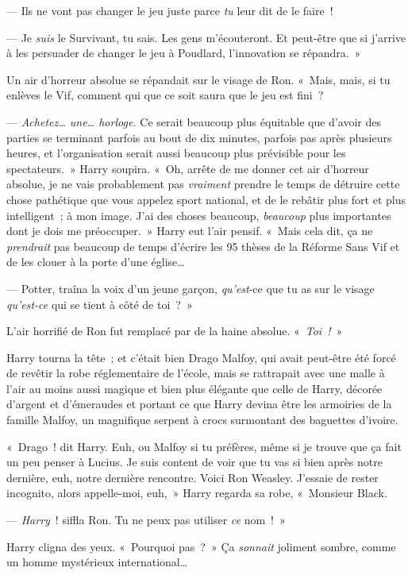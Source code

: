 --- Ils ne vont pas changer le jeu juste parce \emph{tu} leur dit de le faire~!

--- Je \emph{suis} le Survivant, tu sais. Les gens m'écouteront. Et peut-être que si j'arrive à les persuader de changer le jeu à Poudlard, l'innovation se répandra.~»

Un air d'horreur absolue se répandait sur le visage de Ron.
«~Mais, mais, si tu enlèves le Vif, comment qui que ce soit saura que le jeu est fini~?

--- \emph{Achetez… une… horloge.} Ce serait beaucoup plus équitable que d'avoir des parties se terminant parfois au bout de dix minutes, parfois pas après plusieurs heures, et l'organisation serait aussi beaucoup plus prévisible pour les spectateurs.~» Harry soupira. «~Oh, arrête de me donner cet air d'horreur absolue, je ne vais probablement pas \emph{vraiment} prendre le temps de détruire cette chose pathétique que vous appelez sport national, et de le rebâtir plus fort et plus intelligent~; à mon image. J'ai des choses beaucoup, \emph{beaucoup} plus importantes dont je dois me préoccuper.~» Harry eut l'air pensif. «~Mais cela dit, ça ne \emph{prendrait} pas beaucoup de temps d'écrire les 95 thèses de la Réforme Sans Vif et de les clouer à la porte d'une église…

--- Potter, traîna la voix d'un jeune garçon, \emph{qu'est}-ce que tu as sur le visage \emph{qu'est-ce} qui se tient à côté de toi~?~»

L'air horrifié de Ron fut remplacé par de la haine absolue. «~\emph{Toi~!}~»

Harry tourna la tête~; et c'était bien Drago Malfoy, qui avait peut-être été forcé de revêtir la robe réglementaire de l'école, mais se rattrapait avec une malle à l'air au moins aussi magique et bien plus élégante que celle de Harry, décorée d'argent et d'émeraudes et portant ce que Harry devina être les armoiries de la famille Malfoy, un magnifique serpent à crocs surmontant des baguettes d'ivoire.

«~Drago~! dit Harry. Euh, ou Malfoy si tu préfères, même si je trouve que ça fait un peu penser à Lucius. Je suis content de voir que tu vas si bien après notre dernière, euh, notre dernière rencontre. Voici Ron Weasley. J'essaie de rester incognito, alors appelle-moi, euh,~» Harry regarda sa robe, «~Monsieur Black.

--- \emph{Harry}~! siffla Ron. Tu ne peux pas utiliser \emph{ce} nom~!~»

Harry cligna des yeux. «~Pourquoi pas~?~» Ça \emph{sonnait} joliment sombre, comme un homme mystérieux international…

